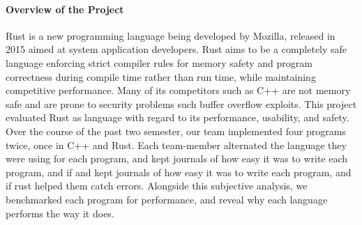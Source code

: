 \paragraph{Overview of the Project}
\par %
Rust is a new programming language being developed by Mozilla, released in 2015
aimed at system application developers. Rust aims to be a completely safe
language enforcing strict compiler rules for memory safety and program correctness during
compile time rather than run time, while maintaining competitive performance.
Many of its competitors such as C++ are not memory safe and are prone to security
problems such buffer overflow exploits. 
This project evaluated Rust as language with regard to its performance, usability,
and safety. Over the course of the past two semester, our team implemented
four programs twice, once in C++ and Rust. Each team-member alternated the
language they were using for each program, and kept journals of how easy it
was to write each program, and if and kept journals of how easy it was to
write each program, and if rust helped them catch errors. Alongside this
subjective analysis, we benchmarked each program for performance, and reveal
why each language performs the way it does.
